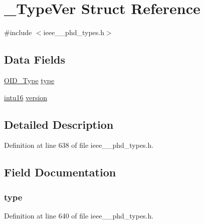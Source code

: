 \hypertarget{struct___type_ver}{}\section{\+\_\+\+Type\+Ver Struct Reference}
\label{struct___type_ver}


{\ttfamily \#include $<$ieee\+\_\+\_\+phd\+\_\+types.\+h$>$}

\subsection*{Data Fields}
\begin{DoxyCompactItemize}
\item 
\hyperlink{ieee__11073__phd__types_8h_aa4d7af235d4a95d6632aa0d64160dd62}{O\+I\+D\+\_\+\+Type} \hyperlink{struct___type_ver_a7e4b92c343b3d589407bac9070db2a2f}{type}
\item 
\hyperlink{ieee__11073__phd__types_8h_a3561595d2aa7416532e1c9910abd076d}{intu16} \hyperlink{struct___type_ver_a8f21cc4af3cb68ecce8552a1bd14a8cf}{version}
\end{DoxyCompactItemize}


\subsection{Detailed Description}


Definition at line 638 of file ieee\+\_\+\_\+phd\+\_\+types.\+h.



\subsection{Field Documentation}
\hypertarget{struct___type_ver_a7e4b92c343b3d589407bac9070db2a2f}{}
\subsubsection[{type}]{ type}\label{struct___type_ver_a7e4b92c343b3d589407bac9070db2a2f}


Definition at line 640 of file ieee\+\_\+\_\+phd\+\_\+types.\+h.

\hypertarget{struct___type_ver_a8f21cc4af3cb68ecce8552a1bd14a8cf}{}
